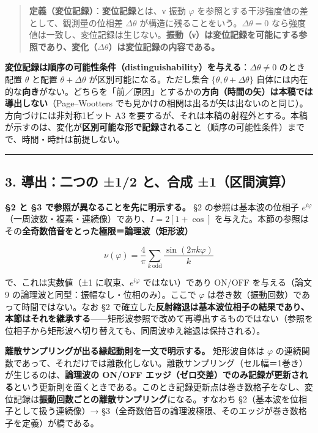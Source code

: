 \documentclass[
]{ltjsarticle}
\begin{document}
\begin{quote}
\textbf{定義（変位記録）}：\textbf{変位記録}とは、ν 振動 \(\varphi\)
を参照とする干渉強度値の差として、観測量の位相差 \(\Delta\theta\)
が構造に残ることをいう。\(\Delta\theta=0\)
なら強度値は一致し、変位記録は生じない。\textbf{振動（ν）は変位記録を可能にする参照であり、変化（\(\Delta\theta\)）は変位記録の内容である。}
\end{quote}

\textbf{変位記録は順序の可能性条件（distinguishability）を与える}：\(\Delta\theta\neq0\)
のとき配置 \(\theta\) と配置 \(\theta+\Delta\theta\)
が区別可能になる。ただし集合 \(\{\theta,\theta+\Delta\theta\}\)
自体には内在的な\textbf{向き}がない。どちらを「前／原因」とするかの\textbf{方向（時間の矢）は本稿では導出しない}（Page--Wootters
でも見かけの相関は出るが矢は出ないのと同じ）。方向づけには非対称1ビット
A3
を要するが、それは本稿の射程外とする。本稿が示すのは、変化が\textbf{区別可能な形で記録される}こと（順序の可能性条件）までで、時間・時計は前提しない。

\begin{center}\rule{0.5\linewidth}{0.5pt}\end{center}

\subsection{3. 導出：二つの ±1/2 と、合成
±1（区間演算）}\label{ux5c0eux51faux4e8cux3064ux306e-12-ux3068ux5408ux6210-1ux533aux9593ux6f14ux7b97}

\textbf{§2 と §3 で参照が異なることを先に明示する。} §2
の参照は基本波の位相子
\(e^{i\varphi}\)（一周波数・複素・連続像）であり、\(I=2[1+\cos]\)
を与えた。本節の参照はその\textbf{全奇数倍音をとった極限＝論理波（矩形波）}

\[
\nu(\varphi)=\frac{4}{\pi}\sum_{k\ \text{odd}}\frac{\sin(2\pi k \varphi)}{k}
\]

で、これは実数値（±1 に収束、\(e^{i\varphi}\) ではない）であり ON/OFF
を与える（論文9 の論理波と同型：振幅なし・位相のみ）。ここで \(\varphi\)
は巻き数（振動回数）であって時間ではない。なお §2
で確立した\textbf{反射縮退は基本波位相子の結果であり、本節はそれを継承する}------矩形波参照で改めて再導出するものではない（参照を位相子から矩形波へ切り替えても、同周波ゆえ縮退は保持される）。

\textbf{離散サンプリングが出る縁起動則を一文で明示する。} 矩形波自体は
\(\varphi\)
の連続関数であって、それだけでは離散化しない。離散サンプリング（セル幅＝1巻き）が生じるのは、\textbf{論理波の
ON/OFF
エッジ（ゼロ交差）でのみ記録が更新される}という更新則を置くときである。このとき記録更新点は巻き数格子をなし、変位記録は\textbf{振動回数ごとの離散サンプリング}になる。すなわち
§2（基本波を位相子として扱う連続像）→
§3（全奇数倍音の論理波極限、そのエッジが巻き数格子を定義）が橋である。
\end{document}
